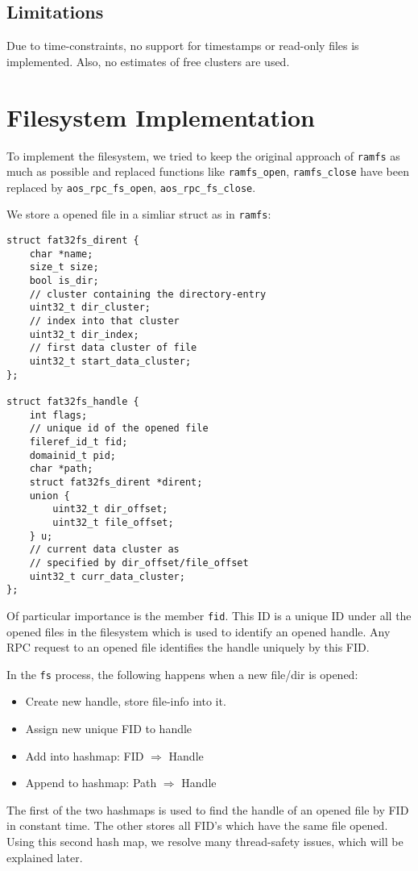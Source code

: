 \subsection{Limitations}
Due to time-constraints, no support for timestamps or read-only files is implemented.
Also, no estimates of free clusters are used.
\section{Filesystem Implementation}
To implement the filesystem, we tried to keep the original approach of \texttt{ramfs}
as much as possible and replaced functions like \texttt{ramfs\_open}, \texttt{ramfs\_close}
have been replaced by \texttt{aos\_rpc\_fs\_open}, \texttt{aos\_rpc\_fs\_close}.

We store a opened file in a simliar struct as in \texttt{ramfs}:
\begin{verbatim}
struct fat32fs_dirent {
    char *name; 
    size_t size; 
    bool is_dir; 
    // cluster containing the directory-entry
    uint32_t dir_cluster; 
    // index into that cluster
    uint32_t dir_index; 
    // first data cluster of file
    uint32_t start_data_cluster; 
};

struct fat32fs_handle {
    int flags;
    // unique id of the opened file
    fileref_id_t fid;
    domainid_t pid;
    char *path;
    struct fat32fs_dirent *dirent;
    union {
        uint32_t dir_offset;
        uint32_t file_offset;
    } u;
    // current data cluster as 
    // specified by dir_offset/file_offset
    uint32_t curr_data_cluster;
};
\end{verbatim}
Of particular importance is the member \texttt{fid}.
This ID is a unique ID under all the opened files in the filesystem 
which is used to identify an opened handle. Any RPC request to an opened
file identifies the handle uniquely by this FID.

In the \texttt{fs} process, the following happens when a new file/dir is opened:
\begin{itemize}
    \item Create new handle, store file-info into it.
    \item Assign new unique FID to handle
    \item Add into hashmap: FID $\Rightarrow$ Handle 
    \item Append to hashmap: Path $\Rightarrow$ Handle
\end{itemize}
The first of the two hashmaps is used to find the handle of an opened file by FID in constant 
time. The other stores all FID's which have the same file opened. Using this second hash map,
we resolve many thread-safety issues, which will be explained later.

